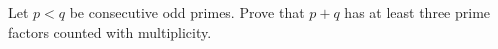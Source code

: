 Let $p<q$ be consecutive odd primes. Prove that $p+q$ has at least three prime factors counted with multiplicity.
